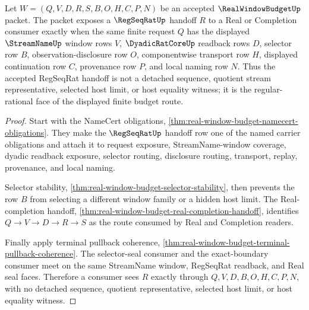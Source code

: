 \begin{theorem}
\label{thm:real-window-budget-regseq-selector-exactness}
Let $W=(Q,V,D,R,S,B,O,H,C,P,N)$ be an accepted $\RealWindowBudgetUp$ packet.
The packet exposes a $\RegSeqRatUp$ handoff $R$ to a Real or Completion
consumer exactly when the same finite request $Q$ has the displayed
$\StreamNameUp$ window rows $V$, $\DyadicRatCoreUp$ readback rows $D$,
selector row $B$, observation-disclosure row $O$, componentwise transport row
$H$, displayed continuation row $C$, provenance row $P$, and local naming row
$N$. Thus the accepted RegSeqRat handoff is not a detached sequence, quotient
stream representative, selected host limit, or host equality witness; it is the
regular-rational face of the displayed finite budget route.
\end{theorem}
\begin{proof}
Start with the NameCert obligations,
\autoref{thm:real-window-budget-namecert-obligations}. They make the
$\RegSeqRatUp$ handoff row one of the named carrier obligations and attach it
to request exposure, StreamName-window coverage, dyadic readback exposure,
selector routing, disclosure routing, transport, replay, provenance, and local
naming.

Selector stability,
\autoref{thm:real-window-budget-selector-stability}, then prevents the row $B$
from selecting a different window family or a hidden host limit. The
Real-completion handoff,
\autoref{thm:real-window-budget-real-completion-handoff}, identifies
$Q \to V \to D \to R \to S$ as the route consumed by Real and Completion
readers.

Finally apply terminal pullback coherence,
\autoref{thm:real-window-budget-terminal-pullback-coherence}. The selector-seal
consumer and the exact-boundary consumer meet on the same StreamName window,
RegSeqRat readback, and Real seal faces. Therefore a consumer sees $R$ exactly
through $Q,V,D,B,O,H,C,P,N$, with no detached sequence, quotient
representative, selected host limit, or host equality witness.
\end{proof}

